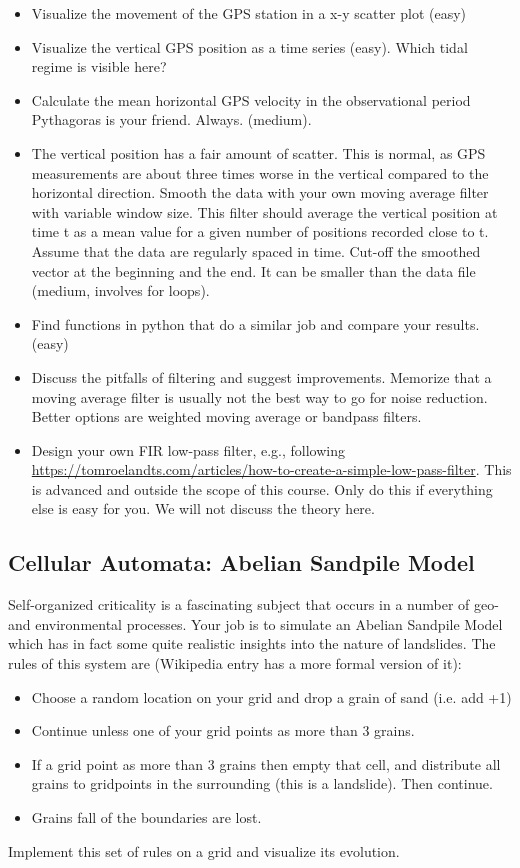 \begin{itemize}
\item Visualize the movement of the GPS station in a x-y scatter plot (easy)
\item Visualize the vertical GPS position as a time series (easy). Which tidal  regime is visible here?
\item Calculate the mean horizontal GPS velocity in the observational period  Pythagoras is your friend. Always. (medium).
\item The vertical position has a fair amount of scatter. This is normal, as GPS measurements are about three times worse in the vertical compared to the horizontal direction. Smooth the data with your own moving average filter with variable window size. This filter should average the vertical position at time t as a mean value for a given number of positions recorded close to t. Assume that the data are regularly spaced in time. Cut-off the smoothed vector at the beginning and the end. It can be smaller than the data file (medium, involves for loops).
\item Find functions in python that  do a similar job and compare your results. (easy)
\item Discuss the pitfalls of filtering and suggest improvements. Memorize that a moving average filter is usually not the best way to go for noise reduction. Better options are weighted moving average or bandpass filters.
\item Design your own FIR low-pass filter, e.g., following \url{https://tomroelandts.com/articles/how-to-create-a-simple-low-pass-filter}. This is advanced and outside the scope of this course. Only do this if everything else is easy for you. We will not discuss the theory here.
\end{itemize}

\subsection{Cellular Automata: Abelian Sandpile Model}
Self-organized criticality is a fascinating subject that occurs in a number of geo- and environmental processes. Your job is to simulate an Abelian Sandpile Model which has in fact some quite realistic insights into the nature of landslides. The rules of this system are (Wikipedia entry has a more formal version of it):
\begin{itemize}
  \item Choose a random location on your grid and drop a grain of sand (i.e. add +1)
  \item Continue unless one of your grid points as more than 3 grains. 
  \item If a grid point as more than 3 grains then empty that cell, and distribute all grains to gridpoints in the surrounding (this is a landslide). Then continue.
  \item Grains fall of the boundaries are lost. 
\end{itemize}
Implement this set of rules on a grid and visualize its evolution.


